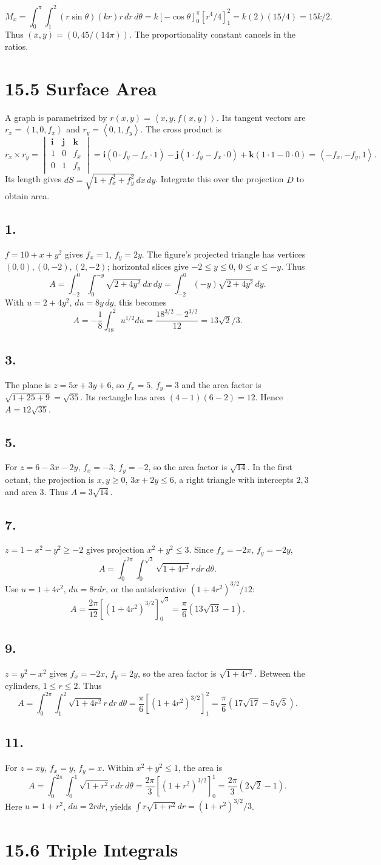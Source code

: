 \documentclass[11pt]{article}
\newcommand{\ex}[1]{\subsection*{#1.}}
\newcommand{\ans}[1]{\boxed{#1}}
\newcommand{\vv}[1]{\left\langle #1\right\rangle}
\newcommand{\ii}{\mathbf i}\newcommand{\jj}{\mathbf j}\newcommand{\kk}{\mathbf k}
\newcommand{\cp}[6]{\begin{vmatrix}\ii&\jj&\kk\\#1&#2&#3\\#4&#5&#6\end{vmatrix}}
\begin{document}
\[M_x=\int_0^\pi\int_1^2(r\sin\theta)(kr)r\,dr\,d\theta
=k[-\cos\theta]_0^\pi[r^4/4]_1^2=k(2)(15/4)=15k/2.\]
Thus $\ans{(\bar x,\bar y)=(0,45/(14\pi))}$. The proportionality constant cancels in the ratios.
\clearpage\section*{15.5 Surface Area}
\noindent A graph is parametrized by $r(x,y)=\vv{x,y,f(x,y)}$. Its tangent vectors are $r_x=\vv{1,0,f_x}$ and $r_y=\vv{0,1,f_y}$. The cross product is
\[r_x\times r_y=\cp{1}{0}{f_x}{0}{1}{f_y}
=\ii(0\cdot f_y-f_x\cdot1)-\jj(1\cdot f_y-f_x\cdot0)+\kk(1\cdot1-0\cdot0)
=\vv{-f_x,-f_y,1}.\]
Its length gives $dS=\sqrt{1+f_x^2+f_y^2}\,dx\,dy$. Integrate this over the projection $D$ to obtain area.
\ex{1}
$f=10+x+y^2$ gives $f_x=1$, $f_y=2y$. The figure's projected triangle has vertices $(0,0),(0,-2),(2,-2)$; horizontal slices give $-2\le y\le0$, $0\le x\le-y$. Thus
\[A=\int_{-2}^0\int_0^{-y}\sqrt{2+4y^2}\,dx\,dy
=\int_{-2}^0(-y)\sqrt{2+4y^2}\,dy.\]
With $u=2+4y^2$, $du=8y\,dy$, this becomes
\[A=-\frac18\int_{18}^{2}u^{1/2}du
=\frac{18^{3/2}-2^{3/2}}{12}=\ans{13\sqrt2/3}.\]
\ex{3}
The plane is $z=5x+3y+6$, so $f_x=5$, $f_y=3$ and the area factor is $\sqrt{1+25+9}=\sqrt{35}$. Its rectangle has area $(4-1)(6-2)=12$. Hence $\ans{A=12\sqrt{35}}$.
\ex{5}
For $z=6-3x-2y$, $f_x=-3$, $f_y=-2$, so the area factor is $\sqrt{14}$. In the first octant, the projection is $x,y\ge0$, $3x+2y\le6$, a right triangle with intercepts $2,3$ and area $3$. Thus $\ans{A=3\sqrt{14}}$.
\ex{7}
$z=1-x^2-y^2\ge-2$ gives projection $x^2+y^2\le3$. Since $f_x=-2x$, $f_y=-2y$,
\[A=\int_0^{2\pi}\int_0^{\sqrt3}\sqrt{1+4r^2}r\,dr\,d\theta.
\]
Use $u=1+4r^2$, $du=8rdr$, or the antiderivative $(1+4r^2)^{3/2}/12$:
\[A=\frac{2\pi}{12}[ (1+4r^2)^{3/2}]_0^{\sqrt3}=\ans{\frac\pi6(13\sqrt{13}-1)}.\]
\ex{9}
$z=y^2-x^2$ gives $f_x=-2x$, $f_y=2y$, so the area factor is $\sqrt{1+4r^2}$. Between the cylinders, $1\le r\le2$. Thus
\[A=\int_0^{2\pi}\int_1^2\sqrt{1+4r^2}r\,dr\,d\theta
=\frac\pi6[(1+4r^2)^{3/2}]_1^2=\ans{\frac\pi6(17\sqrt{17}-5\sqrt5)}.\]
\ex{11}
For $z=xy$, $f_x=y$, $f_y=x$. Within $x^2+y^2\le1$, the area is
\[A=\int_0^{2\pi}\int_0^1\sqrt{1+r^2}r\,dr\,d\theta
=\frac{2\pi}{3}[(1+r^2)^{3/2}]_0^1=\ans{\frac{2\pi}{3}(2\sqrt2-1)}.\]
Here $u=1+r^2$, $du=2rdr$, yields $\int r\sqrt{1+r^2}dr=(1+r^2)^{3/2}/3$.
\clearpage\section*{15.6 Triple Integrals}
\end{document}
